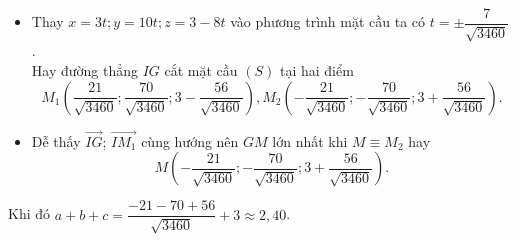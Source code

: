 \begin{bt}
{\begin{itemize}
			\item Thay $x=3t;y=10t;z=3-8t$ vào phương trình mặt cầu ta có $t= \pm \dfrac{7}{\sqrt{3460}}$. \\Hay đường  thẳng $IG$ cắt mặt cầu $(S)$ tại hai điểm $$M_1\left(\dfrac{21}{\sqrt{3460}};\dfrac{70}{\sqrt{3460}};3-\dfrac{56}{\sqrt{3460}}\right), M_2\left(-\dfrac{21}{\sqrt{3460}};-\dfrac{70}{\sqrt{3460}};3+\dfrac{56}{\sqrt{3460}}\right).$$
			\item Dễ thấy $\overrightarrow{IG}$; $\overrightarrow{IM_1}$ cùng hướng nên  $G M$ lớn nhất khi $M \equiv M_2$ hay $$M\left(-\dfrac{21}{\sqrt{3460}};-\dfrac{70}{\sqrt{3460}};3+\dfrac{56}{\sqrt{3460}}\right).$$
		\end{itemize}
		Khi đó $a+b+c=\dfrac{-21-70+56}{\sqrt{3460}}+3 \approx 2{,}40$. 
	} 
\end{bt}

